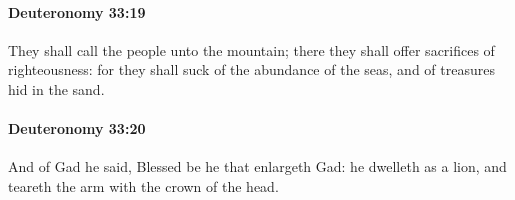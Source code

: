		\paragraph{Deuteronomy 33:19} %
			\label{DEUTERONOMY-33-19}

			They shall call the people unto the mountain; there they shall offer sacrifices of righteousness: for they shall suck of the abundance of the seas, and of treasures hid in the sand.


		\paragraph{Deuteronomy 33:20} %
			\label{DEUTERONOMY-33-20}

			And of Gad he said, Blessed be he that enlargeth Gad: he dwelleth as a lion, and teareth the arm with the crown of the head.


